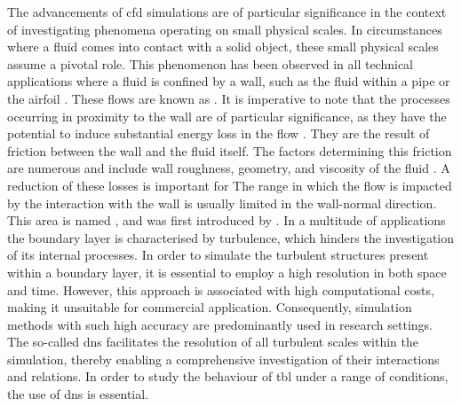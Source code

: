 The advancements of \acrshort{cfd} simulations are of  particular significance in the context of investigating phenomena operating on small physical scales.
In circumstances where a fluid comes into contact with a solid object, these small physical scales assume a pivotal role.
This phenomenon has been observed in all technical applications where a fluid is confined by a wall, such as the fluid within a pipe or the airfoil \citep{marusic_wall-bounded_2010}.
These flows are known as .
It is imperative to note that the processes occurring in proximity to the wall are of particular significance, as they have the potential to induce substantial
 energy loss in the flow \citep{fan_decomposition_2020}.
They are the result of  friction between the wall and the fluid itself. The factors determining this friction are numerous and include  wall roughness, geometry, and viscosity of the fluid \citep{schlichting_boundary-layer_2017}.
A reduction of these losses is important for 
The range in which the flow is impacted by the interaction with the wall is usually limited in the wall-normal direction.
This area is named , and was first introduced by \citet{prandtl_uber_1904}.
In  a multitude of applications the boundary layer is characterised by turbulence, which hinders the investigation of its internal processes.
In order to simulate the turbulent structures present within a boundary layer, it is essential to employ a high resolution in both space and time.
However, this approach is associated with   high computational costs, making it unsuitable for commercial application.
Consequently, simulation methods with such high accuracy are predominantly used in research settings.
The so-called \acrfull{dns} facilitates the resolution of all turbulent scales within  the simulation,  thereby enabling a comprehensive investigation  of their interactions and relations.
In order to study the behaviour of \acrfull{tbl} under a range of conditions, the use of \acrshort{dns} is essential. \\


